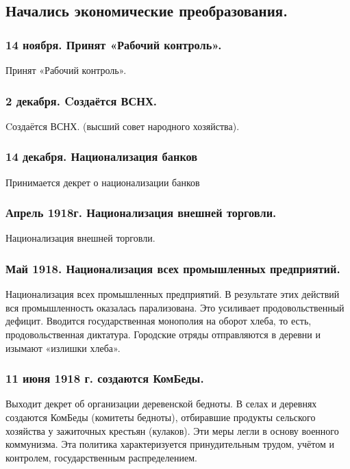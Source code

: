 \subsection{Начались экономические преобразования.}

\subsubsection{\textbf{14 ноября. Принят «Рабочий контроль».}}

Принят «Рабочий контроль».

\subsubsection{\textbf{2 декабря. Cоздаётся ВСНХ.}}

Cоздаётся ВСНХ. (высший совет народного хозяйства).

\subsubsection{\textbf{14 декабря. Национализация банков}}

Принимается декрет о национализации банков

\subsubsection{\textbf{Апрель 1918г. Национализация внешней торговли.}}

Национализация внешней торговли.

\subsubsection{\textbf{Май 1918. Национализация всех промышленных предприятий.}}

Национализация всех промышленных предприятий. В результате этих действий вся промышленность оказалась парализована. Это усиливает продовольственный дефицит. Вводится государственная монополия на оборот хлеба, то есть, продовольственная диктатура. Городские отряды отправляются в деревни и изымают «излишки хлеба».

\subsubsection{\textbf{11 июня 1918 г. создаются КомБеды.}}

Выходит декрет об организации деревенской бедноты. В селах и деревнях создаются КомБеды (комитеты бедноты), отбиравшие продукты сельского хозяйства у зажиточных крестьян (кулаков). Эти меры легли в основу военного коммунизма. Эта политика характеризуется принудительным трудом, учётом и контролем, государственным распределением.

